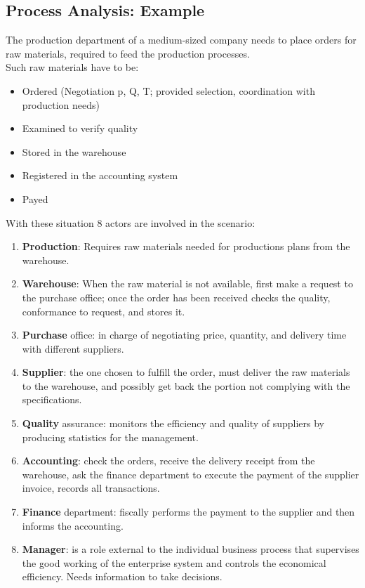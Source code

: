 \documentclass[12pt]{article}
\begin{document}
\subsection{Process Analysis: Example}
The production department of a medium-sized company needs to place orders for raw materials, required to feed the production processes.\\
Such raw materials have to be:
\begin{itemize}
  \item Ordered (Negotiation p, Q, T; provided selection, coordination with production needs)
  \item Examined to verify quality
  \item Stored in the warehouse
  \item Registered in the accounting system
  \item Payed
\end{itemize}
With these situation 8 actors are involved in the scenario:
\begin{enumerate}
  \item \textbf{Production}: Requires raw materials needed for productions plans from the warehouse.
  \item \textbf{Warehouse}: When the raw material is not available, first make a request to the purchase office; once the order has been received checks the quality, conformance to request, and stores it.
  \item \textbf{Purchase} office: in charge of negotiating price, quantity, and delivery time with different suppliers.
  \item \textbf{Supplier}: the one chosen to fulfill the order, must deliver the raw materials to the warehouse, and possibly get back the portion not complying with the specifications.
  \item \textbf{Quality} assurance: monitors the efficiency and quality of suppliers by producing statistics for the management.
  \item \textbf{Accounting}: check the orders, receive the delivery receipt from the warehouse, ask the finance department to execute the payment of the supplier invoice, records all transactions.
  \item \textbf{Finance} department: fiscally performs the payment to the supplier and then informs the accounting.
  \item \textbf{Manager}: is a role external to the individual business process that supervises the good working of the enterprise system and controls the economical efficiency. Needs information to take decisions.
\end{enumerate}
\end{document}
